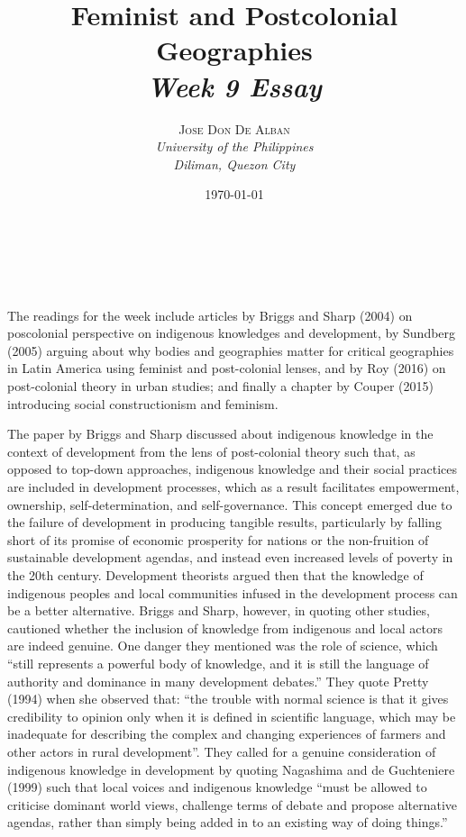 \documentclass[a4paper, 10.5pt]{article} %
\title{\textbf{Feminist and Postcolonial Geographies}\\ %
\textsl{Week 9 Essay}} %
\author{\textsc{Jose Don De Alban} %
\\{\textit{University of the Philippines} %
\\{\textit{Diliman, Quezon City}}}} %
\date{\today} %
\makeatletter
\renewcommand{\maketitle}
{
\begin{flushright} %
{\LARGE\@title} %
\vspace{40pt} %

{\large\@author} %
\\\@date %

\vspace{10pt} %
\end{flushright}
}
\makeatother
\begin{document}
\maketitle %


\section*{}

The readings for the week include articles by Briggs and Sharp (2004) \cite{briggs_sharp_2004} on poscolonial perspective on indigenous knowledges and development, by Sundberg (2005) \cite{sundberg_2005} arguing about why bodies and geographies matter for critical geographies in Latin America using feminist and post-colonial lenses, and by Roy (2016) \cite{roy_2016} on post-colonial theory in urban studies; and finally a chapter by Couper (2015) \cite{couper_2015} introducing social constructionism and feminism.

The paper by Briggs and Sharp discussed about indigenous knowledge in the context of development from the lens of post-colonial theory such that, as opposed to top-down approaches, indigenous knowledge and their social practices are included in development processes, which as a result facilitates empowerment, ownership, self-determination, and self-governance. This concept emerged due to the failure of development in producing tangible results, particularly by falling short of its promise of economic prosperity for nations or the non-fruition of sustainable development agendas, and instead even increased levels of poverty in the 20th century. Development theorists argued then that the knowledge of indigenous peoples and local communities infused in the development process can be a better alternative. Briggs and Sharp, however, in quoting other studies, cautioned whether the inclusion of knowledge from indigenous and local actors are indeed genuine. One danger they mentioned was the role of science, which \enquote{still represents a powerful body of knowledge, and it is still the language of authority and dominance in many development debates.} They quote Pretty (1994) when she observed that: \enquote{the trouble with normal science is that it gives credibility to opinion only when it is defined in scientific language, which may be inadequate for describing the complex and changing experiences of farmers and other actors in rural development}. They called for a genuine consideration of indigenous knowledge in development by quoting Nagashima and de Guchteniere (1999) such that local voices and indigenous knowledge \enquote{must be allowed to criticise dominant world views, challenge terms of debate and propose alternative agendas, rather than simply being added in to an existing way of doing things.}
\end{document}
